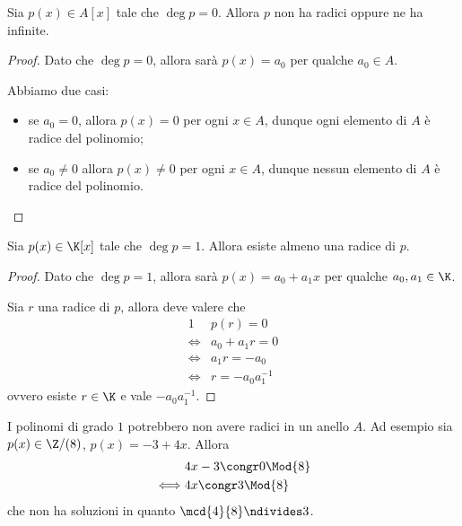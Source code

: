 \begin{proposition}
    Sia $p(x) \in A[x]$ tale che $\deg p = 0$. Allora $p$ non ha radici oppure ne ha infinite.
\end{proposition}
\begin{proof}
    Dato che $\deg p = 0$, allora sarà $p(x) = a_0$ per qualche $a_0 \in A$.

    Abbiamo due casi: \begin{itemize}
        \item se $a_0 = 0$, allora $p(x) = 0$ per ogni $x \in A$, dunque ogni elemento di $A$ è radice del polinomio;
        \item se $a_0 \neq 0$ allora $p(x) \neq 0$ per ogni $x \in A$, dunque nessun elemento di $A$ è radice del polinomio. \qedhere
    \end{itemize}
\end{proof}


\begin{proposition}
    Sia $p(x) \in \K[x]$ tale che $\deg p = 1$. Allora esiste almeno una radice di $p$.
\end{proposition}
\begin{proof}
    Dato che $\deg p = 1$, allora sarà $p(x) = a_0 + a_1x$ per qualche $a_0, a_1 \in \K$.

    Sia $r$ una radice di $p$, allora deve valere che \begin{alignat*}
        {1}
        &p(r) = 0 \\
        \iff &a_0 + a_1r = 0 \\
        \iff &a_1r = -a_0 \\
        \iff &r = -a_0a_1^{-1}
    \end{alignat*}
    ovvero esiste $r \in \K$ e vale $-a_0a_1^{-1}$.
\end{proof}

\begin{remark}
    I polinomi di grado $1$ potrebbero non avere radici in un anello $A$. Ad esempio sia $p(x) \in \Z/(8)$, $p(x) = -3 + 4x$. Allora \begin{alignat*}
        {1}
        &4x - 3\congr 0 \Mod{8} \\
        \iff &4x \congr 3 \Mod{8}
    \end{alignat*}
    che non ha soluzioni in quanto $\mcd{4}{8} \ndivides 3$.
\end{remark}

